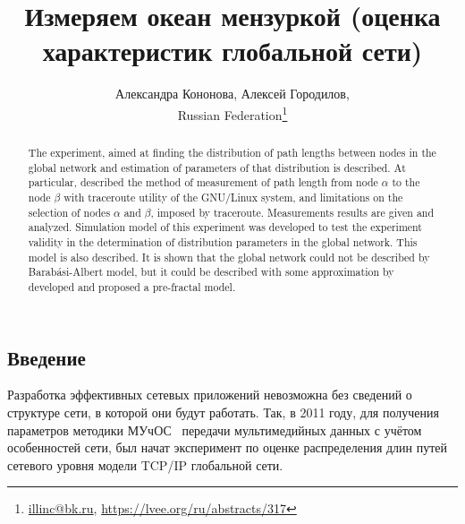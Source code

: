 \documentclass[10pt, a5paper]{article}
\begin{document}
\title{Измеряем океан мензуркой (оценка характеристик глобальной сети)}
\author{Александра Кононова, Алексей Городилов, \\ Russian Federation\footnote{\url{illinc@bk.ru}, \url{https://lvee.org/ru/abstracts/317}}}
\maketitle
\begin{abstract}
The experiment, aimed at finding the distribution of path lengths between nodes in the global network and estimation of parameters of that distribution is described. 
At particular, described the method of measurement of path length from node $\alpha$ to the node $\beta$ with traceroute utility of the GNU/Linux system, and limitations on the selection of nodes $\alpha$ and $\beta$, imposed by trace\-route.
Measurements results are given and analyzed.
Simulation model of this experiment was developed to test the experiment validity in the determination of distribution parameters in the global network. This model is also described. 
It is shown that the global network could not be described by Barab\'{a}si-Albert model, but it could be described with some approximation by developed and proposed a pre-fractal model.
\end{abstract}

\subsection*{Введение}


Разработка эффективных сетевых приложений невозможна без сведений о структуре сети, в которой они будут работать. Так, в 2011 году, для получения параметров методики МУчОС~\cite{muchos} передачи мультимедийных данных с учётом особенностей сети, был начат эксперимент по оценке распределения длин путей  сетевого уровня модели TCP/IP глобальной сети.
\end{document}
